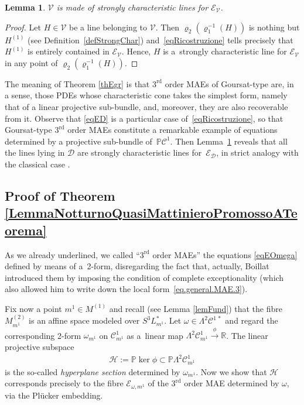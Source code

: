 \documentclass[pdftex]{sigma}
\newcommand{\R}{\mathbb{R}}
\newcommand{\C}{\mathcal{C}}
\newcommand{\D}{\mathcal{D}}
\newcommand{\M}{\mathcal{V}}
\newcommand{\E}{\mathcal{E}}
\renewcommand{\P}{\mathbb{P}}
\newcommand{\Rd}{^\textrm{rd}}
\newcommand{\p}{\varrho}
\numberwithin{equation}{section}
\newtheorem{Lemma}[Theorem]{Lemma}
\begin{document}
\begin{Lemma}\label{LemmuccioSimpatico}
 $\M$ is made of strongly characteristic lines for $\E_\M$.
\end{Lemma}
\begin{proof}
 Let $H\in \M$ be a line belonging to $\M$. Then $\p_2(\p_1^{-1}(H))$ is nothing but $H^{(1)}$ (see Def\/inition~\ref{defStrongChar}) and~\eqref{eqRicostruzione} tells precisely that $H^{(1)}$ is entirely contained in $\E_\M$. Hence, $H$ is a~strongly characteristic line for $\E_\M$ in any point of $\p_2(\p_1^{-1}(H))$.
\end{proof}

The meaning of Theorem \ref{thEgr} is that $3\Rd$ order MAEs of Goursat-type are, in a sense, those PDEs whose characteristic cone takes the simplest form, namely that of a linear projective sub-bundle, and, moreover, they are also recoverable from it.
Observe that \eqref{eqED} is a particular case of~\eqref{eqRicostruzione}, so that Goursat-type $3\Rd$ order MAEs constitute a remarkable example of equations determined by a projective sub-bundle of~$\P\C^1$. Then Lemma~\ref{LemmuccioSimpatico} reveals that all the lines lying in $\D$ are strongly characteristic lines for~$\E_\D$, in strict analogy with the classical case \cite{MR2985508}.

\subsection{Proof of Theorem \ref{LemmaNotturnoQuasiMattinieroPromossoATeorema}}

As we already underlined, we called ``$3\Rd$ order MAEs'' the equations \eqref{eqEOmega} def\/ined by means of a~2-form, disregarding the fact that, actually, Boillat introduced them by imposing the condition of complete exceptionality (which also allowed him to write down the local form~\eqref{eq.general.MAE.3}).

Fix now a point $m^1\in M^{(1)}$ and recall (see Lemma \ref{lemFund}) that the f\/ibre $M^{(2)}_{m^1}$ is an af\/f\/ine space modeled over $S^3L_{m^1}^\ast$. Let $\omega\in\Lambda^2\C^{1\,\ast}$ and regard the corresponding 2-form $\omega_{m^1}$ on $\C^1_{m^1}$ as a~linear map
$\Lambda^2\C^{1}_{m^1}\stackrel{\phi}{\longrightarrow} \R$.
The linear projective subspace
\begin{gather}\label{eqHypSec}
\mathcal{H}:=\P\ker\phi\subset \P \Lambda^2\C^{1}_{m^1}
\end{gather}
is the so-called \emph{hyperplane section} determined by $ \omega_{m^1}$. Now we show that $\mathcal{H}$ corresponds precisely to the f\/ibre $\E_{\omega, m^1}$ of the $3\Rd$ order MAE determined by $\omega$, via the Pl\"ucker embedding.
\end{document}
